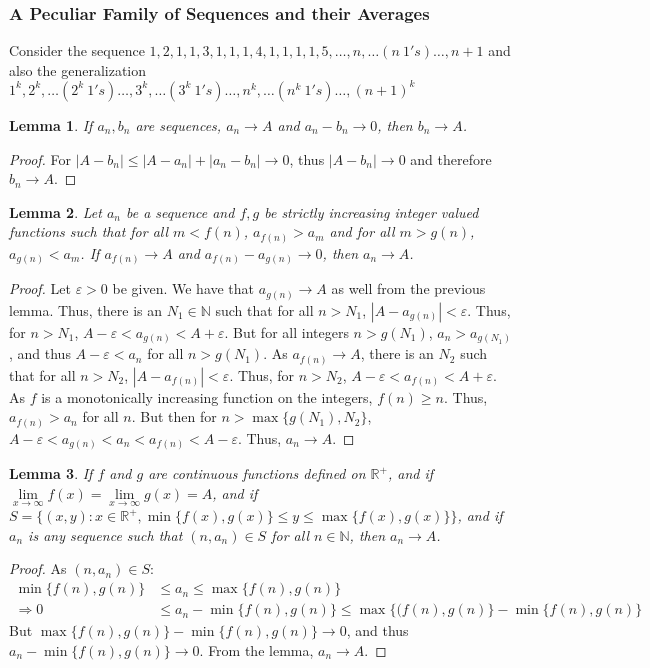 \documentclass[crop=false,class=book]{standalone}
\theoremstyle{mystyle}
\newtheorem{lemma}{Lemma}[section]
\begin{document}
\subsubsection{A Peculiar Family of Sequences and their Averages}
Consider the sequence $1,2,1,1,3,1,1,1,4,1,1,1,1,5,\hdots, n,\hdots (n\ 1's)\hdots, n+1$ and also the generalization $1^k, 2^k,\hdots (2^k\ 1's)\hdots, 3^k, \hdots (3^k\ 1's)\hdots, n^k, \hdots (n^k\ 1's)\hdots, (n+1)^k$
\begin{lemma}
If $a_n, b_n$ are sequences, $a_n\rightarrow A$ and $a_n-b_n\rightarrow 0$, then $b_n \rightarrow A$.
\end{lemma}
\begin{proof}
For $|A-b_n| \leq |A-a_n|+|a_n-b_n| \rightarrow 0$, thus $|A-b_n|\rightarrow 0$ and therefore $b_n \rightarrow A$.
\end{proof}
\begin{lemma}
Let $a_n$ be a sequence and $f,g$ be strictly increasing integer valued functions such that for all $m<f(n)$, $a_{f(n)}>a_m$ and for all $m>g(n)$, $a_{g(n)}<a_m$. If $a_{f(n)}\rightarrow A$ and $a_{f(n)}-a_{g(n)}\rightarrow 0$, then $a_n \rightarrow A$.
\end{lemma}
\begin{proof}
Let $\varepsilon>0$ be given. We have that $a_{g(n)}\rightarrow A$ as well from the previous lemma. Thus, there is an $N_1 \in \mathbb{N}$ such that for all $n>N_1$, $|A-a_{g(n)}|<\varepsilon$. Thus, for $n>N_1$, $A-\varepsilon < a_{g(n)}<A+\varepsilon$. But for all integers $n>g(N_1)$, $a_n >a_{g(N_1)}$, and thus $A-\varepsilon < a_n$ for all $n>g(N_1)$. As $a_{f(n)}\rightarrow A$, there is an $N_2$ such that for all $n>N_2$, $|A-a_{f(n)}|<\varepsilon$. Thus, for $n>N_2$, $A-\varepsilon < a_{f(n)}<A+\varepsilon$. As $f$ is a monotonically increasing function on the integers, $f(n)\geq n$. Thus, $a_{f(n)}>a_n$ for all $n$. But then for $n>\max\{g(N_1),N_2\}$, $A-\varepsilon < a_{g(n)} < a_n < a_{f(n)}<A-\varepsilon$. Thus, $a_n \rightarrow A$.
\end{proof}
\begin{lemma}
If $f$ and $g$ are continuous functions defined on $\mathbb{R}^+$, and if $\underset{x\rightarrow \infty}\lim f(x) = \underset{x\rightarrow \infty}\lim g(x)=A$, and if $S = \{(x,y):x\in \mathbb{R}^+,\min\{f(x),g(x)\}\leq y \leq \max\{f(x),g(x)\}\}$, and if $a_n$ is any sequence such that $(n,a_n)\in S$ for all $n\in \mathbb{N}$, then $a_n \rightarrow A$.
\end{lemma}
\begin{proof}
As $(n,a_n)\in S$:
\begin{align*}
    \min\{f(n),g(n)\} &\leq a_n \leq \max\{f(n),g(n)\}\\
    \Rightarrow 0 &\leq a_n - \min\{f(n),g(n)\} \leq \max\{(f(n),g(n)\}-\min\{f(n),g(n)\}    
\end{align*}
But $\max\{f(n),g(n)\}-\min\{f(n),g(n)\} \rightarrow 0$, and thus $a_n - \min\{f(n),g(n)\} \rightarrow 0$. From the lemma, $a_n \rightarrow A$.
\end{proof}
\end{document}
